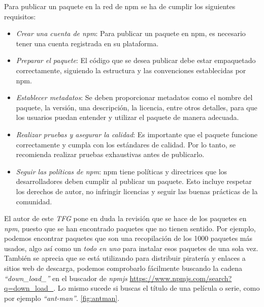 Para publicar un paquete en la red de npm se ha de cumplir los siguientes requisitos:

\begin{itemize}
    \item \textit{Crear una cuenta de npm}: Para publicar un paquete en npm, es necesario tener una cuenta registrada en su plataforma.

    \item \textit{Preparar el paquete}: El código que se desea publicar debe estar empaquetado correctamente, siguiendo la estructura y las convenciones establecidas por npm.

    \item \textit{Establecer metadatos}: Se deben proporcionar metadatos como el nombre del paquete, la versión, una descripción, la licencia, entre otros detalles, para que los usuarios puedan entender y utilizar el paquete de manera adecuada.

    \item \textit{Realizar pruebas y asegurar la calidad}: Es importante que el paquete funcione correctamente y cumpla con los estándares de calidad. Por lo tanto, se recomienda realizar pruebas exhaustivas antes de publicarlo.

    \item \textit{Seguir las políticas de npm}: npm tiene políticas y directrices que los desarrolladores deben cumplir al publicar un paquete. Esto incluye respetar los derechos de autor, no infringir licencias y seguir las buenas prácticas de la comunidad.
\end{itemize}

El autor de este \textit{TFG} pone en duda la revisión que se hace de los paquetes
en \textit{npm}, puesto que se han encontrado paquetes que no tienen sentido.
Por ejemplo,
podemos encontrar paquetes que son una recopilación de los 1000 paquetes más usados, algo
así como un \textit{todo en uno} para instalar esos paquetes de una sola vez.
También se aprecia que se está utilizando para distribuir piratería y enlaces a sitios web
de descarga, podemos comprobarlo fácilmente buscando la cadena \textit{``down\_load\_''} en
el buscador de \textit{npmjs} \url{https://www.npmjs.com/search?q=down\_load\_}.
Lo mismo sucede si buscas el título de una película o serie, como por ejemplo \textit{``ant-man''}. \ref{fig:antman}.


